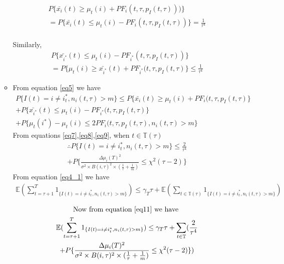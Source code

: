 \documentclass[compress, serif, onlymath, professionalfonts]{beamer}
\begin{document}
\begin{frame}[t,allowframebreaks]
\begin{enumerate}
\begin{itemize}
\begin{multline}\label{eq8}
P\{ \bar{x_i}(t) \geq \mu_t(i) + PF_{i}(t,\tau,p_I(t,\tau)))\}  
\\=P\{ \bar{x_i}(t) \leq \mu_t(i) - PF_{i}(t,\tau,p_I(t,\tau))\}  = \frac{1}{\tau^4} 
\end{multline}
\\Similarly,
\begin{multline}\label{eq9}
P\{\bar{x_{i^*}}(t) \leq \mu_t(i) - PF_{i^*}(t,\tau,p_I(t,\tau))\}
\\=P\{\mu_t(i)  \geq \bar{x_{i^*}}(t)+ PF_{i^*}(t,\tau,p_I(t,\tau)\} \leq \frac{1}{\tau^4} 
\end{multline}
\item 
From equation \ref{eq5} we have
\begin{multline}
P\{I(t)=i\neq i^*_t,n_i(t,\tau)> m\} \leq P\{ \bar{x_i}(t) \geq \mu_t(i) + PF_{i}(t,\tau,p_I(t,\tau)\}  
\\ + P\{\bar{x_{i^*}}(t) \leq \mu_t(i) - PF_{i^*}(t,\tau,p_I(t,\tau)\}
\\ + P\{\mu_t(i^*)-\mu_t(i) \leq 2PF_{i}(t,\tau,p_I(t,\tau),n_i(t,\tau)>m\}
\end{multline}
From equations \ref{eq7},\ref{eq8},\ref{eq9}, when $t \in \mathbb{T(\tau)}$
\begin{multline}\label{eq11}
\therefore
P\{I(t)=i\neq i^*_t,n_i(t,\tau)> m\} \leq \frac{2}{\tau^4}
\\ + P\{\frac{\Delta \mu_i(T)^2}{\sigma^2 \times B(i,\tau)^2 \times (\frac{1}{\tau}+\frac{1}{m})} \leq \chi^2(\tau-2)\}
\end{multline}
From equation \ref{eq4_1} we have
\begin{multline}
\label{12_1}
\mathbb{E}(\sum_{t=\tau+1}^{T}1_{\{I(t)=i\neq i^*_t,n_i(t,\tau)> m\}}) \leq \gamma_T\tau + \mathbb{E}(\sum_{t\in \mathbb{T}(\tau)}1_{\{I(t)=i\neq i^*_t,n_i(t,\tau)> m\}})\\
\end{multline}
\begin{multline}
\label{12}
\text{Now from equation \ref{eq11} we have                      }\\
\mathbb{E}(\sum_{t=\tau+1}^{T}1_{\{I(t)=i\neq i^*_t,n_i(t,\tau)> m\}}) \leq  \gamma_T\tau+\sum_{t\in \mathbb{T}}(\frac{2}{\tau^4}\\+ P\{\frac{\Delta \mu_i(T)^2}{\sigma^2 \times B(i,\tau)^2 \times (\frac{1}{\tau}+\frac{1}{m})} \leq \chi^2(\tau-2)\})
\end{multline}


\end{itemize}
\end{enumerate}
\end{frame}
\end{document}
